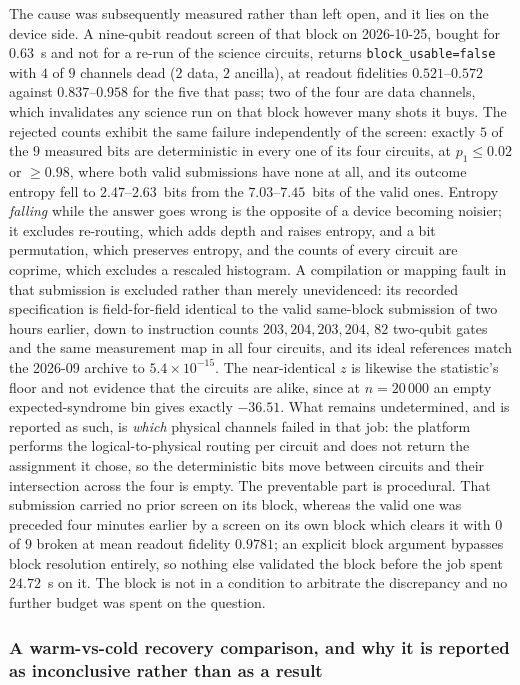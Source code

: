 \documentclass[aps,prxquantum,reprint,superscriptaddress]{revtex4-2}
\begin{document}
The cause was subsequently measured rather than left open, and it lies on the
device side. A nine-qubit readout screen of that block on 2026-10-25, bought for
$0.63$~s and not for a re-run of the science circuits, returns
\texttt{block\_usable=false} with $4$ of $9$ channels dead ($2$ data, $2$
ancilla), at readout fidelities $0.521$--$0.572$ against $0.837$--$0.958$ for the
five that pass; two of the four are data channels, which invalidates any science
run on that block however many shots it buys. The rejected counts exhibit the same
failure independently of the screen: exactly $5$ of the $9$ measured bits are
deterministic in every one of its four circuits, at $p_1\le0.02$ or $\ge0.98$,
where both valid submissions have none at all, and its outcome entropy fell to
$2.47$--$2.63$~bits from the $7.03$--$7.45$~bits of the valid ones. Entropy
\emph{falling} while the answer goes wrong is the opposite of a device becoming
noisier; it excludes re-routing, which adds depth and raises entropy, and a bit
permutation, which preserves entropy, and the counts of every circuit are coprime,
which excludes a rescaled histogram. A compilation or mapping fault in that
submission is excluded rather than merely unevidenced: its recorded specification
is field-for-field identical to the valid same-block submission of two hours
earlier, down to instruction counts $203,204,203,204$, $82$ two-qubit gates and
the same measurement map in all four circuits, and its ideal references match the
2026-09 archive to $5.4\times10^{-15}$. The near-identical $z$ is likewise the
statistic's floor and not evidence that the circuits are alike, since at
$n=20\,000$ an empty expected-syndrome bin gives exactly $-36.51$. What remains
undetermined, and is reported as such, is \emph{which} physical channels failed in
that job: the platform performs the logical-to-physical routing per circuit and
does not return the assignment it chose, so the deterministic bits move between
circuits and their intersection across the four is empty. The preventable part is
procedural. That submission carried no prior screen on its block, whereas the
valid one was preceded four minutes earlier by a screen on its own block which
clears it with $0$ of $9$ broken at mean readout fidelity $0.9781$; an explicit
block argument bypasses block resolution entirely, so nothing else validated the
block before the job spent $24.72$~s on it. The block is not in a condition to
arbitrate the discrepancy and no further budget was spent on the question.

\subsubsection*{A warm-vs-cold recovery comparison, and why it is reported as
inconclusive rather than as a result}
\end{document}
